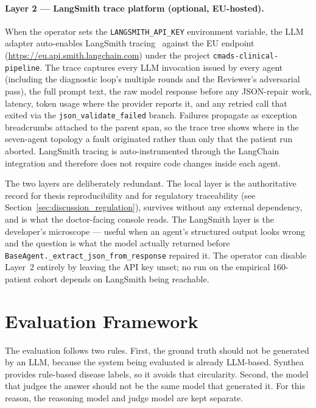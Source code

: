 \paragraph{Layer 2 --- LangSmith trace platform (optional, EU-hosted).}
When the operator sets the \texttt{LANGSMITH\_API\_KEY} environment
variable, the LLM adapter auto-enables LangSmith
tracing~\cite{LangSmith2024} against the EU endpoint
(\url{https://eu.api.smith.langchain.com}) under the project
\texttt{cmads-clinical-pipeline}. The trace captures every LLM
invocation issued by every agent (including the diagnostic loop's
multiple rounds and the Reviewer's adversarial pass), the full prompt
text, the raw model response before any JSON-repair work, latency,
token usage where the provider reports it, and any retried call that
exited via the \texttt{json\_validate\_failed} branch. Failures
propagate as exception breadcrumbs attached to the parent span, so
the trace tree shows where in the seven-agent topology a fault
originated rather than only that the patient run aborted. LangSmith
tracing is auto-instrumented through the LangChain integration and
therefore does not require code changes inside each agent.

The two layers are deliberately redundant. The local layer is the
authoritative record for thesis reproducibility and for regulatory
traceability (see Section~\ref{sec:discussion_regulation}), survives
without any external dependency, and is what the doctor-facing
console reads. The LangSmith layer is the developer's microscope ---
useful when an agent's structured output looks wrong and the question
is what the model actually returned before
\texttt{BaseAgent.\_extract\_json\_from\_response} repaired it. The
operator can disable Layer~2 entirely by leaving the API key unset;
no run on the empirical 160-patient cohort depends on LangSmith being
reachable.

\FloatBarrier
\section{Evaluation Framework}
\label{sec:evaluation}

The evaluation follows two rules. First, the ground truth should not be
generated by an LLM, because the system being evaluated is already LLM-based.
Synthea provides rule-based disease labels, so it avoids that circularity.
Second, the model that judges the answer should not be the same model that
generated it. For this reason, the reasoning model and judge model are kept
separate.

